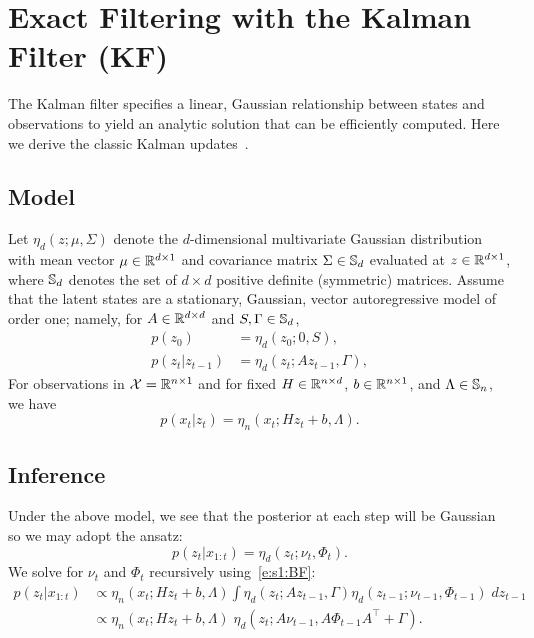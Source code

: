 \section{Exact Filtering with the Kalman Filter (KF)} 

The Kalman filter specifies a linear, Gaussian relationship between states and observations to yield an analytic solution that can be efficiently computed.  Here we derive the classic Kalman updates~\cite{Kal60,Kal61}.

\subsection{Model} \label{s:KF:mdl}
Let $\eta_d(z;\mu,\Sigma)$ denote the $d$-dimensional multivariate Gaussian distribution with mean vector $\mu\in\mathbb{R}^{d\times 1}$ and covariance matrix $\Sigma\in\mathbb{S}_d$ evaluated at $z\in\mathbb{R}^{d\times 1}$, where $\mathbb{S}_d$ denotes the set of $d\!\times\!d$ positive definite (symmetric) matrices.
Assume that the latent states are a stationary, Gaussian, vector autoregressive model of order one; namely, for $A\in\mathbb{R}^{d\times d}$ and $S,\Gamma\in\mathbb{S}_d$,   
\begin{subequations} \label{e:s1:KFstateproc}
\begin{align}
 p(z_0) & = \eta_d(z_0;0,S), \label{e:s1:KFstationary} \\ 
 p(z_t|z_{t-1}) & = \eta_d(z_t;Az_{t-1},\Gamma), \label{e:s1:KFpred} 
\end{align}
\end{subequations}
For observations in ${\mathcal{X}}=\mathbb{R}^{n\times 1}$ and for fixed $H\in\mathbb{R}^{n\times d}$, $b\in\mathbb{R}^{n\times 1}$, and $\Lambda\in\mathbb{S}_n$, we have
\begin{equation} \label{e:s1:KFobs}
p(x_t|z_t) = \eta_n(x_t;Hz_t+b,\Lambda).
\end{equation}

\subsection{Inference}
Under the above model, we see that the posterior at each step will be Gaussian so we may adopt the ansatz:
\begin{equation} \label{e:s1:KFposterior}
p(z_t|x_{1:t}) = \eta_d(z_t; \nu_t, \Phi_t).
\end{equation}
We solve for $\nu_t$ and $\Phi_t$ recursively using~\eqref{e:s1:BF}:
\begin{align} 
p(z_t|x_{1:t}) 
&\propto \eta_n(x_t;Hz_t+b,\Lambda) \int \eta_d(z_t;Az_{t-1},\Gamma) \eta_d(z_{t-1}; \nu_{t-1}, \Phi_{t-1}) \; dz_{t-1} \\
&\propto \eta_n(x_t;Hz_t+b,\Lambda)\; \eta_d(z_t;A\nu_{t-1},A\Phi_{t-1}A^\intercal + \Gamma) \label{e:s1:BF_Kalman}.
\end{align}


